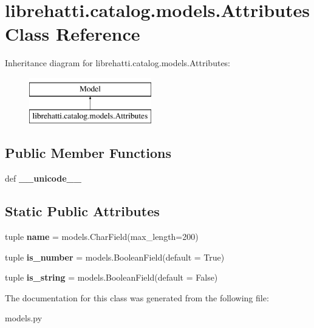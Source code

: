 \hypertarget{classlibrehatti_1_1catalog_1_1models_1_1Attributes}{\section{librehatti.\-catalog.\-models.\-Attributes Class Reference}
\label{classlibrehatti_1_1catalog_1_1models_1_1Attributes}
}
Inheritance diagram for librehatti.\-catalog.\-models.\-Attributes\-:\begin{figure}[H]
\begin{center}
\leavevmode
\includegraphics[height=2.000000cm]{classlibrehatti_1_1catalog_1_1models_1_1Attributes}
\end{center}
\end{figure}
\subsection*{Public Member Functions}
\begin{DoxyCompactItemize}
\item 
\hypertarget{classlibrehatti_1_1catalog_1_1models_1_1Attributes_af3990fd5eebcee1d0d19a2b548909a95}{def {\bfseries \-\_\-\-\_\-unicode\-\_\-\-\_\-}}\label{classlibrehatti_1_1catalog_1_1models_1_1Attributes_af3990fd5eebcee1d0d19a2b548909a95}

\end{DoxyCompactItemize}
\subsection*{Static Public Attributes}
\begin{DoxyCompactItemize}
\item 
\hypertarget{classlibrehatti_1_1catalog_1_1models_1_1Attributes_a78c8c34d983715e03c4e4257f543ff50}{tuple {\bfseries name} = models.\-Char\-Field(max\-\_\-length=200)}\label{classlibrehatti_1_1catalog_1_1models_1_1Attributes_a78c8c34d983715e03c4e4257f543ff50}

\item 
\hypertarget{classlibrehatti_1_1catalog_1_1models_1_1Attributes_a6b0c73f5b89a01e105ef1be2cd217b57}{tuple {\bfseries is\-\_\-number} = models.\-Boolean\-Field(default = True)}\label{classlibrehatti_1_1catalog_1_1models_1_1Attributes_a6b0c73f5b89a01e105ef1be2cd217b57}

\item 
\hypertarget{classlibrehatti_1_1catalog_1_1models_1_1Attributes_a29baacb3571048c37b291ee2994336f8}{tuple {\bfseries is\-\_\-string} = models.\-Boolean\-Field(default = False)}\label{classlibrehatti_1_1catalog_1_1models_1_1Attributes_a29baacb3571048c37b291ee2994336f8}

\end{DoxyCompactItemize}


The documentation for this class was generated from the following file\-:\begin{DoxyCompactItemize}
\item 
models.\-py\end{DoxyCompactItemize}
